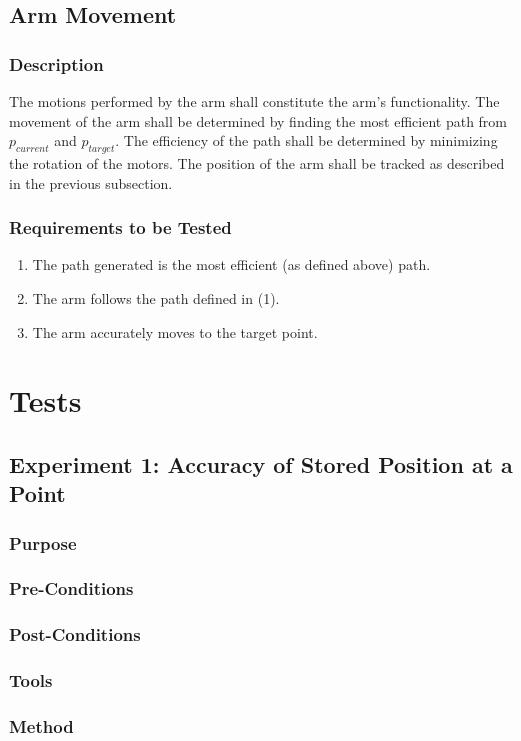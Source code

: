 \documentclass[letterpaper,10pt]{article}
\begin{document}
\subsection{Arm Movement}
\subsubsection{Description}
The motions performed by the arm shall constitute the arm's functionality. The
movement of the arm shall be determined by finding the most efficient path from
\(p_{current}\) and \(p_{target}\). The efficiency of the path shall be
determined by minimizing the rotation of the motors. The position of the arm
shall be tracked as described in the previous subsection.
\subsubsection{Requirements to be Tested}
\begin{enumerate}
\item{The path generated is the most efficient (as defined above) path.}
\item{The arm follows the path defined in (1).}
\item{The arm accurately moves to the target point.}
\end{enumerate}

\section{Tests}

\subsection{Experiment 1: Accuracy of Stored Position at a Point}
\subsubsection{Purpose}
\subsubsection{Pre-Conditions}
\subsubsection{Post-Conditions}
\subsubsection{Tools}
\subsubsection{Method}
\end{document}
